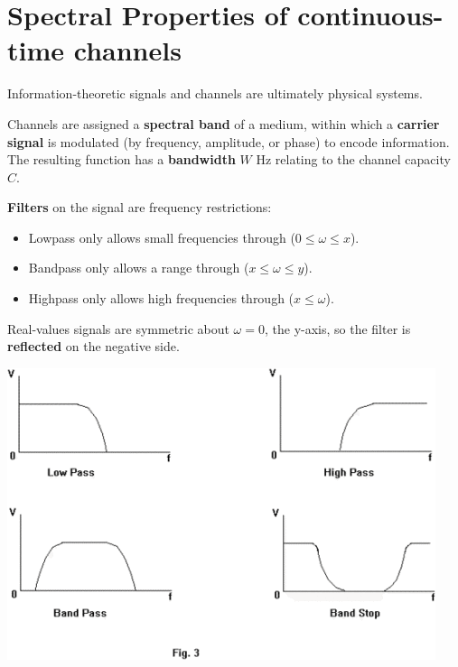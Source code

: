 \documentclass[a4paper, 11pt]{article}
\begin{document}
\section*{Spectral Properties of continuous-time channels}
{
    Information-theoretic signals and channels are ultimately physical systems.

    Channels are assigned a \textbf{spectral band} of a medium, within which a \textbf{carrier signal} is modulated (by frequency, amplitude, or phase) to encode information. The resulting function has a \textbf{bandwidth} \(W\) Hz relating to the channel capacity \(C\).

    \begin{minipage}[t]{0.6\textwidth}
    \setlength{\parskip}{8pt}
    \textbf{Filters} on the signal are frequency restrictions:
    \begin{itemize}
    \item Lowpass only allows small frequencies through (\(0 \leq \omega \leq x\)).
    \item Bandpass only allows a range through (\(x \leq \omega \leq y\)).
    \item Highpass only allows high frequencies through (\(x \leq \omega\)).
    \end{itemize}

    Real-values signals are symmetric about \(\omega=0\), the y-axis, so the filter is \textbf{reflected} on the negative side.
    \end{minipage}
    \hspace{3mm}
    \begin{minipage}[t]{0.35\textwidth}
    \vspace{0pt}
    \centering
    \includegraphics[width=\textwidth]{filters.png}
    \end{minipage}
}
\end{document}
